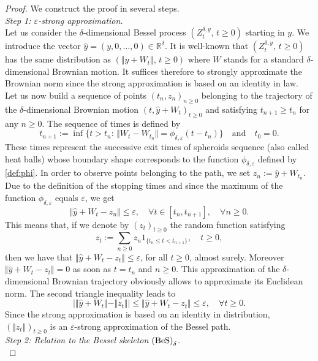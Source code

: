 \documentclass[12pt]{article}
\numberwithin{equation}{section}
\begin{document}
\begin{proof} We construct the proof in several steps.\\[5pt]
\emph{Step 1: $\varepsilon$-strong approximation.}\\[5pt]
Let us consider the $\delta$-dimensional Bessel process $(Z^{\delta,y}_t,\, t\ge 0)$ starting in $y$. We introduce the vector $\hat{y}=(y,0,\ldots,0)\in\mathbb{R}^\delta$. It is well-known that $(Z^{\delta,y}_t,\, t\ge 0)$ has the same distribution as $(\Vert y+W_t \Vert,\, t\ge 0)$ where $W$ stands for a standard $\delta$-dimensional Brownian motion. It suffices therefore to strongly approximate the Brownian norm since the strong approximation is based on an identity in law.\\
Let us now build a sequence of points $(t_n,z_n)_{n\ge 0}$ belonging to the trajectory of the $\delta$-dimensional Brownian motion $(t,\hat{y}+W_t)_{t\ge 0}$ and satisfying $t_{n+1}\ge t_n$ for any $n\ge 0$. The sequence of times is defined by 
\begin{equation}
\label{eq:def:times}
t_{n+1}:=\inf\{t> t_{n}:\, \Vert W_t -W_{t_n}\Vert =\phi_{\delta,\varepsilon}(t-t_n) \}\quad\mbox{and}\quad t_0=0.
\end{equation}
These times represent the successive exit times of spheroids sequence (also called heat balls) whose boundary shape corresponds to the function $\phi_{\delta,\varepsilon}$ defined by \eqref{def:phi}. In order to observe points belonging to the path, we set $z_n:=\hat{y}+W_{t_n}$. Due to the definition of the stopping times and since the maximum of the function $\phi_{\delta,\varepsilon}$ equals $\varepsilon$, we get
\[
\Vert \hat{y}+W_t-z_n\Vert \le \varepsilon,\quad \forall t\in [ t_n, t_{n+1}],\quad \forall n\ge 0.
\]
This means that, if we denote by $(z_t)_{t\ge 0}$ the random function satisfying
\[
z_t:=\sum_{n\ge 0}z_n1_{\{ t_n\le t<t_{n+1} \}},\quad t\ge 0,
\]
then we have that $\Vert \hat{y}+W_t-z_t\Vert \le \varepsilon$, for all $t\ge 0$, almost surely. Moreover $\Vert \hat{y}+W_t-z_t\Vert=0$ as soon as $t=t_n$ and $n\ge 0$. This approximation of the $\delta$-dimensional Brownian trajectory obviously allows to approximate its Euclidean norm. The second triangle inequality leads to
\[
|\Vert \hat{y}+W_t\Vert-\Vert z_t\Vert|\le \Vert \hat{y}+W_t-z_t\Vert \le \varepsilon,\quad \forall t\ge 0.
\]
Since the strong approximation is based on an identity in distribution, $(\Vert z_t \Vert)_{t\ge 0}$ is an $\varepsilon$-strong approximation of the Bessel path.\\[5pt] 
\noindent\emph{Step 2: Relation to the Bessel skeleton ${\rm (BeS)}_{\delta}$.}\\[5pt]

\end{proof}
\end{document}
